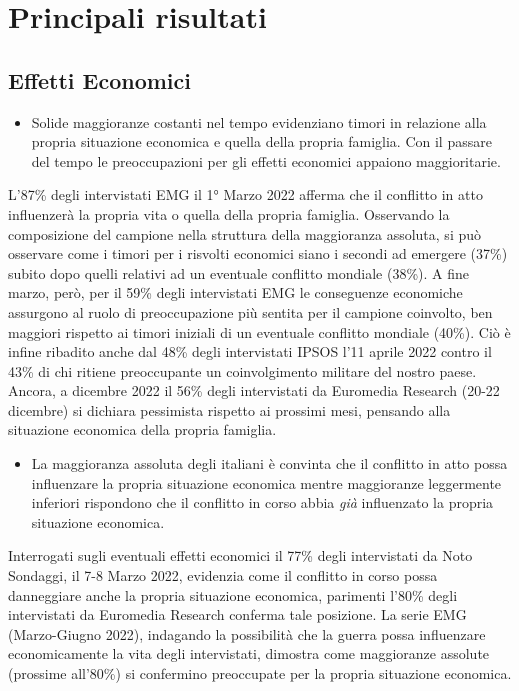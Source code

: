 \documentclass[
  openany]{book}
\providecommand{\tightlist}{%
  \setlength{\itemsep}{0pt}\setlength{\parskip}{0pt}}
\begin{document}
\hypertarget{principali-risultati-4}{%
\section{Principali risultati}\label{principali-risultati-4}}

\hypertarget{effetti-economici}{%
\subsection{Effetti Economici}\label{effetti-economici}}

\begin{itemize}
\tightlist
\item
  Solide maggioranze costanti nel tempo evidenziano timori in relazione alla propria situazione economica e quella della propria famiglia. Con il passare del tempo le preoccupazioni per gli effetti economici appaiono maggioritarie.
\end{itemize}

L'87\% degli intervistati EMG il 1° Marzo 2022 afferma che il conflitto in atto influenzerà la propria vita o quella della propria famiglia. Osservando la composizione del campione nella struttura della maggioranza assoluta, si può osservare come i timori per i risvolti economici siano i secondi ad emergere (37\%) subito dopo quelli relativi ad un eventuale conflitto mondiale (38\%). A fine marzo, però, per il 59\% degli intervistati EMG le conseguenze economiche assurgono al ruolo di preoccupazione più sentita per il campione coinvolto, ben maggiori rispetto ai timori iniziali di un eventuale conflitto mondiale (40\%). Ciò è infine ribadito anche dal 48\% degli intervistati IPSOS l'11 aprile 2022 contro il 43\% di chi ritiene preoccupante un coinvolgimento militare del nostro paese. Ancora, a dicembre 2022 il 56\% degli intervistati da Euromedia Research (20-22 dicembre) si dichiara pessimista rispetto ai prossimi mesi, pensando alla situazione economica della propria famiglia.

\begin{itemize}
\tightlist
\item
  La maggioranza assoluta degli italiani è convinta che il conflitto in atto possa influenzare la propria situazione economica mentre maggioranze leggermente inferiori rispondono che il conflitto in corso abbia \emph{già} influenzato la propria situazione economica.
\end{itemize}

Interrogati sugli eventuali effetti economici il 77\% degli intervistati da Noto Sondaggi, il 7-8 Marzo 2022, evidenzia come il conflitto in corso possa danneggiare anche la propria situazione economica, parimenti l'80\% degli intervistati da Euromedia Research conferma tale posizione. La serie EMG (Marzo-Giugno 2022), indagando la possibilità che la guerra possa influenzare economicamente la vita degli intervistati, dimostra come maggioranze assolute (prossime all'80\%) si confermino preoccupate per la propria situazione economica.
\end{document}
